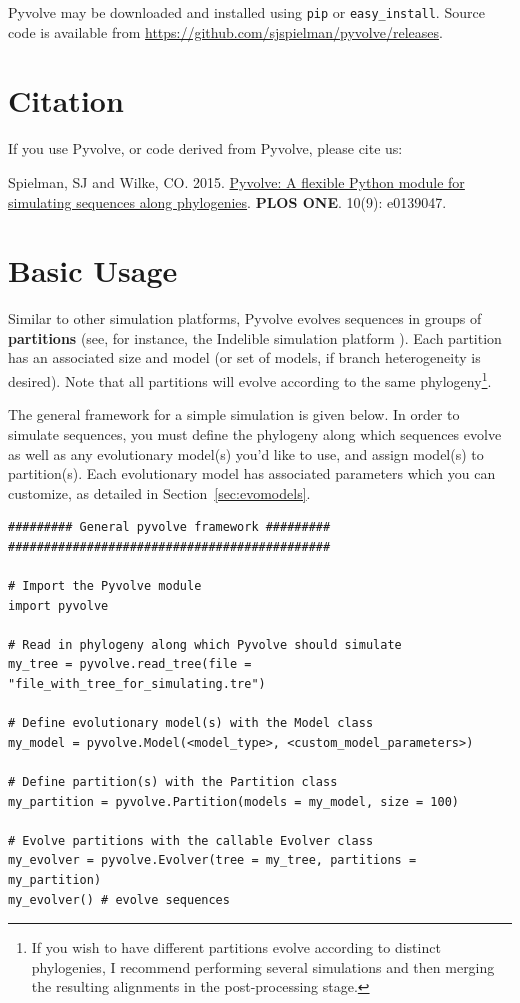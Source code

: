 \documentclass{article}
\newcommand{\code}[1]{\texttt{\small{#1}}}
\begin{document}
Pyvolve may be downloaded and installed using \code{pip} or \code{easy\_install}. Source code is available from \href{https://github.com/sjspielman/pyvolve/releases}{https://github.com/sjspielman/pyvolve/releases}.

\section{Citation}

If you use Pyvolve, or code derived from Pyvolve, please cite us:

Spielman, SJ and Wilke, CO. 2015. \href{http://journals.plos.org/plosone/article?id=10.1371/journal.pone.0139047}{Pyvolve: A flexible Python module for simulating sequences along phylogenies}. \textbf{PLOS ONE}. 10(9): e0139047.


\section{Basic Usage}

Similar to other simulation platforms, Pyvolve evolves sequences in groups of \textbf{partitions} (see, for instance, the Indelible simulation platform \citep{Fletcher2009}). Each partition has an associated size and model (or set of models, if branch heterogeneity is desired). Note that all partitions will evolve according to the same phylogeny\footnote{If you wish to have different partitions evolve according to distinct phylogenies, I recommend performing several simulations and then merging the resulting alignments in the post-processing stage.}.

The general framework for a simple simulation is given below. In order to simulate sequences, you must define the phylogeny along which sequences evolve as well as any evolutionary model(s) you'd like to use, and assign model(s) to partition(s). Each evolutionary model has associated parameters which you can customize, as detailed in Section~\ref{sec:evomodels}.

\begin{lstlisting}
######### General pyvolve framework #########
#############################################

# Import the Pyvolve module
import pyvolve

# Read in phylogeny along which Pyvolve should simulate
my_tree = pyvolve.read_tree(file = "file_with_tree_for_simulating.tre")

# Define evolutionary model(s) with the Model class
my_model = pyvolve.Model(<model_type>, <custom_model_parameters>)

# Define partition(s) with the Partition class
my_partition = pyvolve.Partition(models = my_model, size = 100)

# Evolve partitions with the callable Evolver class
my_evolver = pyvolve.Evolver(tree = my_tree, partitions = my_partition)
my_evolver() # evolve sequences
\end{lstlisting}
\end{document}
